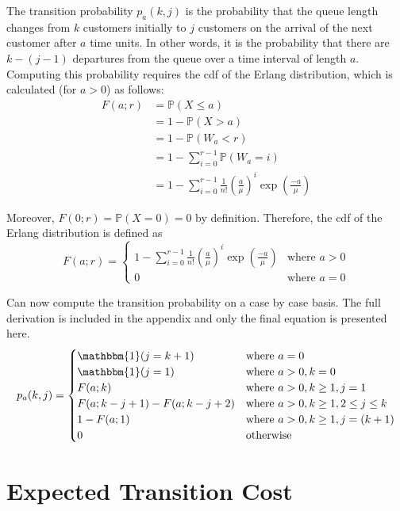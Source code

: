 The transition probability $p_{a} (k, j)$ is the probability that the queue length changes from $k$ customers initially to $j$ customers on the arrival of the next customer after $a$ time units. In other words, it is the probability that there are $k - (j - 1)$ departures from the queue over a time interval of length $a$. Computing this probability requires the cdf of the Erlang distribution, which is calculated (for $a > 0$) as follows:
\begin{align*}
	F (a; r) & = \mathbb{P} (X \leq a) \\
	& = 1 - \mathbb{P} (X > a) \\
	& = 1 - \mathbb{P} (W_{a} < r) \\
	& = 1 - \sum_{i = 0}^{r - 1} \mathbb{P} (W_{a} = i) \\
	& = 1 - \sum_{i = 0}^{r - 1} \frac{1}{n!} \left( \frac{a}{\mu} \right)^{i} \exp \left( \frac{-a}{\mu} \right)
\end{align*}

Moreover, $F (0; r) = \mathbb{P} (X = 0) = 0$ by definition. Therefore, the cdf of the Erlang distribution is defined as
\begin{equation}
	F (a; r) = \begin{cases} 1 - \sum_{i = 0}^{r - 1} \frac{1}{n!} \left( \frac{a}{\mu} \right)^{i} \exp \left( \frac{-a}{\mu} \right) & \text{where $a > 0$} \\ 0 & \text{where $a = 0$} \end{cases}
\end{equation}

Can now compute the transition probability on a case by case basis. The full derivation is included in the appendix and only the final equation is presented here.
\begin{equation}
	p_{a} (k, j) = \begin{cases} \mathbbm{1} (j = k + 1) & \text{where $a = 0$} \\ \mathbbm{1} (j = 1) & \text{where $a > 0, k = 0$} \\ F (a; k) & \text{where $a > 0, k \geq 1, j = 1$} \\ F(a; k - j + 1) - F (a; k - j + 2) & \text{where $a > 0, k \geq 1, 2 \leq j \leq k$} \\ 1 - F(a; 1) & \text{where $a > 0, k \geq 1, j = (k + 1)$} \\ 0 & \text{otherwise} \end{cases}
\end{equation}

\section{Expected Transition Cost}

